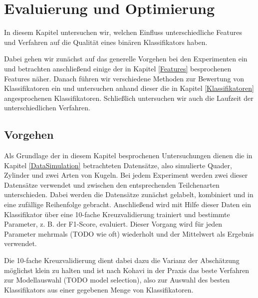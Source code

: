 \section{Evaluierung und Optimierung} \label{eval}


In diesem Kapitel untersuchen wir, welchen Einfluss unterschiedliche Features und Verfahren auf die Qualität eines binären Klassifikators haben.

Dabei gehen wir zunächst auf das generelle Vorgehen bei den Experimenten ein und betrachten anschließend einige der in Kapitel \ref{Features} besprochenen Features näher. Danach führen wir verschiedene Methoden zur Bewertung von Klassifikatoren ein und untersuchen anhand dieser die in Kapitel \ref{Klassifikatoren} angesprochenen Klassifikatoren.
Schließlich untersuchen wir auch die Laufzeit der unterschiedlichen Verfahren.


\subsection{Vorgehen}


Als Grundlage der in diesem Kapitel besprochenen Untersuchungen dienen die in Kapitel \ref{DataSimulation} betrachteten Datensätze, also simulierte Quader, Zylinder und zwei Arten von Kugeln. Bei jedem Experiment werden zwei dieser Datensätze verwendet und zwischen den entsprechenden Teilchenarten unterschieden. Dabei werden die Datensätze zunächst gelabelt, kombiniert und in eine zufällige Reihenfolge gebracht. Anschließend wird mit Hilfe dieser Daten ein Klassifikator über eine 10-fache Kreuzvalidierung trainiert und bestimmte Parameter, z. B. der F1-Score, evaluiert. Dieser Vorgang wird für jeden Parameter mehrmals (TODO wie oft) wiederholt und der Mittelwert als Ergebnis verwendet.

Die 10-fache Kreuzvalidierung dient dabei dazu die Varianz der Abschätzung möglichst klein zu halten und ist nach Kohavi \cite{Kohavi95astudy} in der Praxis das beste Verfahren zur Modellauswahl (TODO model selection), also zur Auswahl des besten Klassifikators aus einer gegebenen Menge von Klassifikatoren.






